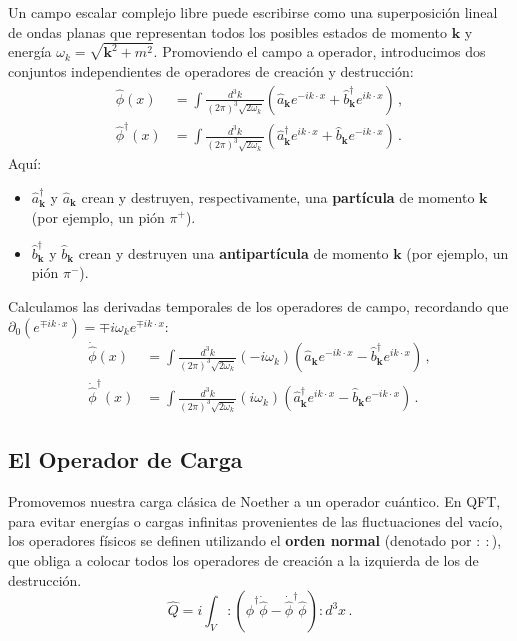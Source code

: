 Un campo escalar complejo libre puede escribirse como una superposición lineal de ondas planas que representan todos los posibles estados de momento $\mathbf{k}$ y energía $\omega_k = \sqrt{\mathbf{k}^2 + m^2}$. Promoviendo el campo a operador, introducimos dos conjuntos independientes de operadores de creación y destrucción:
\begin{align}
    \hat{\phi}(x) &= \int \frac{d^3k}{(2\pi)^3 \sqrt{2\omega_k}} \left( \hat{a}_\mathbf{k} e^{-ik\cdot x} + \hat{b}_\mathbf{k}^\dagger e^{ik\cdot x} \right) \, , \label{eq:phi_op} \\
    \hat{\phi}^\dagger(x) &= \int \frac{d^3k}{(2\pi)^3 \sqrt{2\omega_k}} \left( \hat{a}_\mathbf{k}^\dagger e^{ik\cdot x} + \hat{b}_\mathbf{k} e^{-ik\cdot x} \right) \, . \label{eq:phi_dag_op}
\end{align}
Aquí:
\begin{itemize}
    \item $\hat{a}_\mathbf{k}^\dagger$ y $\hat{a}_\mathbf{k}$ crean y destruyen, respectivamente, una \textbf{partícula} de momento $\mathbf{k}$ (por ejemplo, un pión $\pi^+$).
    \item $\hat{b}_\mathbf{k}^\dagger$ y $\hat{b}_\mathbf{k}$ crean y destruyen una \textbf{antipartícula} de momento $\mathbf{k}$ (por ejemplo, un pión $\pi^-$).
\end{itemize}

Calculamos las derivadas temporales de los operadores de campo, recordando que $\partial_0 (e^{\mp ik\cdot x}) = \mp i\omega_k e^{\mp ik\cdot x}$:
\begin{align}
    \dot{\hat{\phi}}(x) &= \int \frac{d^3k}{(2\pi)^3 \sqrt{2\omega_k}} (-i\omega_k) \left( \hat{a}_\mathbf{k} e^{-ik\cdot x} - \hat{b}_\mathbf{k}^\dagger e^{ik\cdot x} \right) \, , \\
    \dot{\hat{\phi}}^\dagger(x) &= \int \frac{d^3k}{(2\pi)^3 \sqrt{2\omega_k}} (i\omega_k) \left( \hat{a}_\mathbf{k}^\dagger e^{ik\cdot x} - \hat{b}_\mathbf{k} e^{-ik\cdot x} \right) \, .
\end{align}

\subsection{El Operador de Carga}

Promovemos nuestra carga clásica de Noether a un operador cuántico. En QFT, para evitar energías o cargas infinitas provenientes de las fluctuaciones del vacío, los operadores físicos se definen utilizando el \textbf{orden normal} (denotado por $:\ :$), que obliga a colocar todos los operadores de creación a la izquierda de los de destrucción.
\begin{equation}
    \hat{Q} = i \int_V :\left( \hat{\phi}^\dagger \dot{\hat{\phi}} - \dot{\hat{\phi}}^\dagger \hat{\phi} \right): d^3x \, .
\end{equation}

